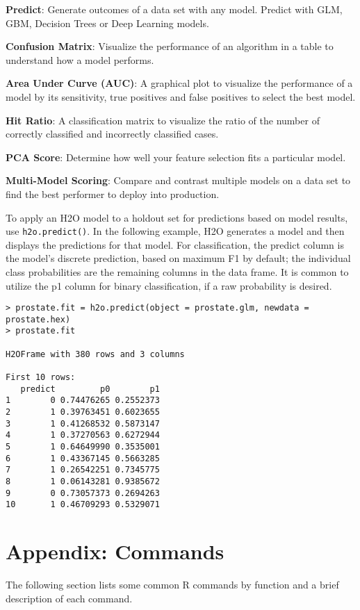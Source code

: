 {{{\textbf{Predict}}: Generate outcomes of a data set with any model. Predict with GLM, GBM, Decision Trees or Deep Learning models.

{\textbf{Confusion Matrix}}: Visualize the performance of an algorithm in a table to understand how a model performs.

{\textbf{Area Under Curve (AUC)}}: A graphical plot to visualize the performance of a model by its sensitivity, true positives and false positives to select the best model.

{\textbf{Hit Ratio}}: A classification matrix to visualize the ratio of the number of correctly classified and incorrectly classified cases.

{\textbf{PCA Score}}: Determine how well your feature selection fits a particular model.

{\textbf{Multi-Model Scoring}}: Compare and contrast multiple models on a data set to find the best performer to deploy into production. 

To apply an H2O model to a holdout set for predictions based on model results, use {\texttt{h2o.predict()}}.  
In the following example, H2O generates a model and then displays the predictions for that model.
For classification, the predict column is the model's discrete prediction, based on maximum F1 by default; the individual class probabilities are the remaining columns in the data frame. 
It is common to utilize the p1 column for binary classification, if a raw probability is desired.
\smallskip
\begin{lstlisting}[style=R]
> prostate.fit = h2o.predict(object = prostate.glm, newdata = prostate.hex)
> prostate.fit

H2OFrame with 380 rows and 3 columns

First 10 rows:
   predict         p0        p1
1        0 0.74476265 0.2552373
2        1 0.39763451 0.6023655
3        1 0.41268532 0.5873147
4        1 0.37270563 0.6272944
5        1 0.64649990 0.3535001
6        1 0.43367145 0.5663285
7        1 0.26542251 0.7345775
8        1 0.06143281 0.9385672
9        0 0.73057373 0.2694263
10       1 0.46709293 0.5329071
\end{lstlisting}

\newpage
\section{Appendix: Commands} \label{Appendix} 

The following section lists some common R commands by function and a brief description of each command. 

}}

